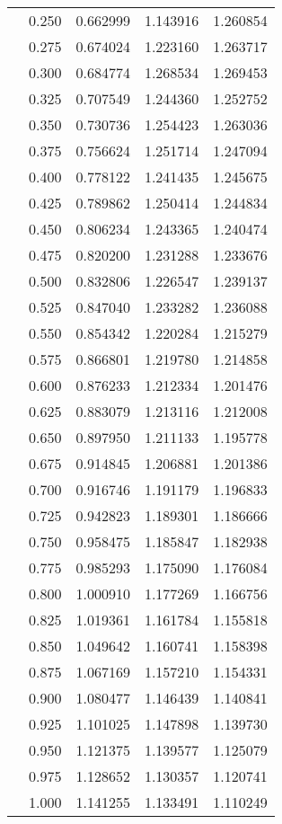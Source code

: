 \begin{tabular}{llrrr}
         & 0.250 &   0.662999 &   1.143916 &   1.260854 \\
         & 0.275 &   0.674024 &   1.223160 &   1.263717 \\
         & 0.300 &   0.684774 &   1.268534 &   1.269453 \\
         & 0.325 &   0.707549 &   1.244360 &   1.252752 \\
         & 0.350 &   0.730736 &   1.254423 &   1.263036 \\
         & 0.375 &   0.756624 &   1.251714 &   1.247094 \\
         & 0.400 &   0.778122 &   1.241435 &   1.245675 \\
         & 0.425 &   0.789862 &   1.250414 &   1.244834 \\
         & 0.450 &   0.806234 &   1.243365 &   1.240474 \\
         & 0.475 &   0.820200 &   1.231288 &   1.233676 \\
         & 0.500 &   0.832806 &   1.226547 &   1.239137 \\
         & 0.525 &   0.847040 &   1.233282 &   1.236088 \\
         & 0.550 &   0.854342 &   1.220284 &   1.215279 \\
         & 0.575 &   0.866801 &   1.219780 &   1.214858 \\
         & 0.600 &   0.876233 &   1.212334 &   1.201476 \\
         & 0.625 &   0.883079 &   1.213116 &   1.212008 \\
         & 0.650 &   0.897950 &   1.211133 &   1.195778 \\
         & 0.675 &   0.914845 &   1.206881 &   1.201386 \\
         & 0.700 &   0.916746 &   1.191179 &   1.196833 \\
         & 0.725 &   0.942823 &   1.189301 &   1.186666 \\
         & 0.750 &   0.958475 &   1.185847 &   1.182938 \\
         & 0.775 &   0.985293 &   1.175090 &   1.176084 \\
         & 0.800 &   1.000910 &   1.177269 &   1.166756 \\
         & 0.825 &   1.019361 &   1.161784 &   1.155818 \\
         & 0.850 &   1.049642 &   1.160741 &   1.158398 \\
         & 0.875 &   1.067169 &   1.157210 &   1.154331 \\
         & 0.900 &   1.080477 &   1.146439 &   1.140841 \\
         & 0.925 &   1.101025 &   1.147898 &   1.139730 \\
         & 0.950 &   1.121375 &   1.139577 &   1.125079 \\
         & 0.975 &   1.128652 &   1.130357 &   1.120741 \\
         & 1.000 &   1.141255 &   1.133491 &   1.110249 \\
\bottomrule
\end{tabular}
